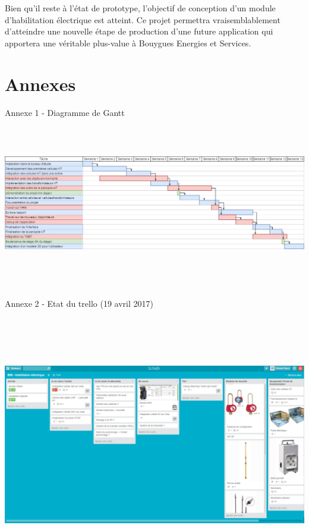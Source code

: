 \documentclass[a4paper]{article}
\begin{document}
    Bien qu'il reste à l'état de prototype, l'objectif de conception d'un module d'habilitation électrique est atteint. Ce projet permettra vraisemblablement  d'atteindre une nouvelle étape de production d'une future application qui apportera une véritable plus-value à Bouygues Energies et Services. \\

    \newpage
    \section{Annexes}

    \centering
    \huge Annexe 1 - Diagramme de Gantt \\
    \vspace{10pt}
    \includegraphics[width=16.25cm,height=7.5cm]{img/GanttStage}

    \huge Annexe 2 - Etat du trello (19 avril 2017) \\
    \vspace{10pt}
    \includegraphics[width=16.25cm,height=12cm]{img/trello1}
\end{document}
